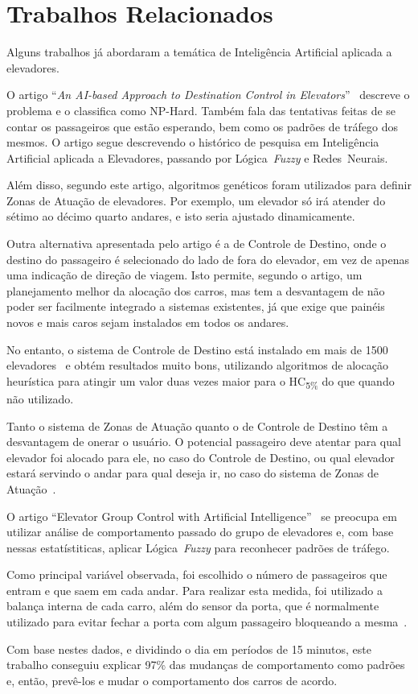 \chapter{\label{chap:related}Trabalhos Relacionados}

Alguns trabalhos já abordaram a temática de Inteligência Artificial aplicada a
elevadores. %

O artigo ``\textit{An AI-based Approach to Destination Control in
  Elevators}''~\cite{KOEHLEROTTIGER02} descreve o problema e o classifica como
NP-Hard. Também fala das tentativas feitas de se contar os passageiros que estão
esperando, bem como os padrões de tráfego dos mesmos. O artigo segue descrevendo
o histórico de pesquisa em Inteligência Artificial aplicada a Elevadores,
passando por Lógica~\textit{Fuzzy} e Redes~Neurais. 

Além disso, segundo este artigo, algoritmos genéticos foram utilizados para definir Zonas de
Atuação de elevadores. Por exemplo, um elevador só irá atender do sétimo ao
décimo quarto andares, e isto seria ajustado dinamicamente.

Outra alternativa apresentada pelo artigo é a de Controle de Destino, onde o
destino do passageiro é selecionado do lado de fora do elevador, em vez de
apenas uma indicação de direção de viagem. Isto permite, segundo o artigo, um
planejamento melhor da alocação dos carros, mas tem a desvantagem de não poder
ser facilmente integrado a sistemas existentes, já que exige que painéis novos e
mais caros sejam instalados em todos os andares.

No entanto, o sistema de Controle de Destino está instalado em mais de 1500
elevadores~\cite{KOEHLEROTTIGER02} e obtém resultados muito bons, utilizando
algoritmos de alocação heurística para atingir um valor duas vezes maior para o
HC\textsubscript{5\%} do que quando não utilizado.

Tanto o sistema de Zonas de Atuação quanto o de Controle de Destino têm a
desvantagem de onerar o usuário. O potencial passageiro deve atentar para qual
elevador foi alocado para ele, no caso do Controle de Destino, ou qual elevador
estará servindo o andar para qual deseja ir, no caso do sistema de Zonas de Atuação~\cite{KOEHLEROTTIGER02}.

O artigo ``Elevator Group Control with Artificial Intelligence''~\cite{marja97}
se preocupa em utilizar análise de comportamento passado do grupo de elevadores
e, com base nessas estatístiticas, aplicar Lógica~\textit{Fuzzy} para reconhecer
padrões de tráfego.

Como principal variável observada, foi escolhido o número de passageiros que
entram e que saem em cada andar. Para realizar esta medida, foi utilizado a
balança interna de cada carro, além do sensor da porta, que é normalmente
utilizado para evitar fechar a porta com algum passageiro bloqueando a mesma~\cite{marja97}.

Com base nestes dados, e dividindo o dia em períodos de 15 minutos, este
trabalho conseguiu explicar 97\% das mudanças de comportamento como padrões e,
então, prevê-los e mudar o comportamento dos carros de acordo.